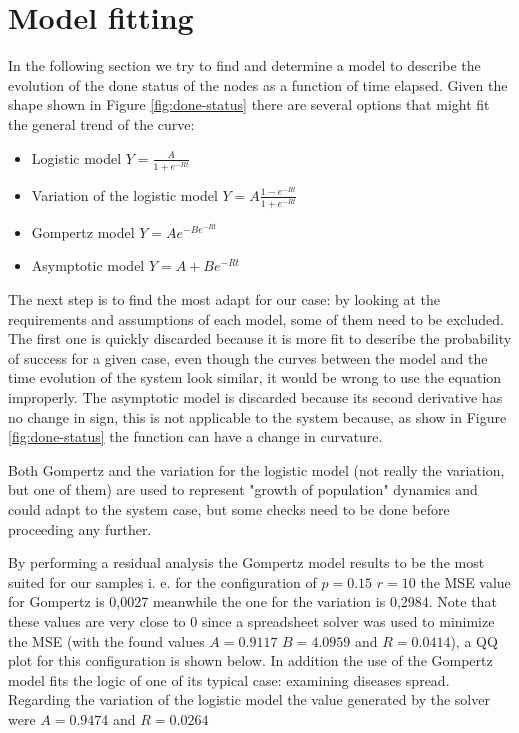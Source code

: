 \section{Model fitting} \label{sec:ModelFitting}
In the following section we try to find and determine a model to describe the evolution of the done status of the nodes as a function of time elapsed. Given the shape shown in Figure \ref{fig:done-status} there are several options that might fit the general trend of the curve:

\begin{itemize}
	\item Logistic model $ Y = \frac{A}{1 + e^{-Rt}} $
	\item Variation of the logistic model $ Y = A\frac{1-e^{-Rt}}{1+e^{-Rt}}$
	\item Gompertz model $ Y = Ae^{-Be^{-Rt}} $
	
	\item Asymptotic model $ Y = A + Be^{-Rt}$
\end{itemize} 

The next step is to find the most adapt for our case: by looking at the requirements and assumptions of each model, some of them need to be excluded. The first one is quickly discarded because it is more fit to describe the probability of success for a given case, even though the curves between the model and the time evolution of the system look similar, it would be wrong to use the equation improperly.
The asymptotic model is discarded because its second derivative has no change in sign, this is not applicable to the system because, as show in Figure \ref{fig:done-status} the function can have a change in curvature.


Both Gompertz and the variation for the logistic model (not really the variation, but one of them) are used to represent "growth of population" dynamics and could adapt to the system case, but some checks need to be done before proceeding any further.

By performing a residual analysis the Gompertz model results to be the most suited for our samples i. e. for the configuration of $p=0.15$  $r=10$ the MSE value for Gompertz is 0,0027 meanwhile the one for the variation is 0,2984. Note that these values are very close to 0 since a spreadsheet solver was used to minimize the MSE (with the found values $A=0.9117$ $B=4.0959$ and $R=0.0414$), a QQ plot for this configuration is shown below. In addition the use of the Gompertz model fits the logic of one of its typical case: examining diseases spread. Regarding the variation of the logistic model the value generated by the solver were $A=0.9474$ and $R=0.0264$


